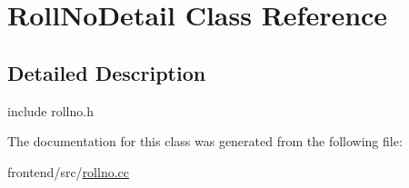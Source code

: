 \hypertarget{classRollNoDetail}{\section{Roll\-No\-Detail Class Reference}
\label{classRollNoDetail}
}


\subsection{Detailed Description}
include rollno.\-h 

The documentation for this class was generated from the following file\-:\begin{DoxyCompactItemize}
\item 
frontend/src/\hyperlink{rollno_8cc}{rollno.\-cc}\end{DoxyCompactItemize}
